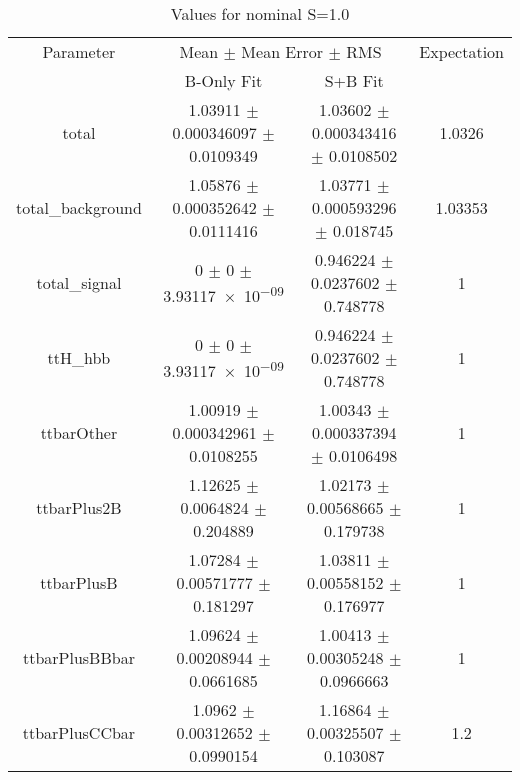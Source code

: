 \begin{table}
\centering
\caption{Values for nominal S=1.0}
\begin{tabular}{cccc}
\toprule
Parameter & \multicolumn{2}{c}{Mean $\pm$ Mean Error $\pm$ RMS} & Expectation\\
 & B-Only Fit & S+B Fit & \\
\midrule
total & \num{1.03911} $\pm$ \num{0.000346097} $\pm$ \num{0.0109349} & \num{1.03602} $\pm$ \num{0.000343416} $\pm$ \num{0.0108502} & \num{1.0326}\\
total\_background & \num{1.05876} $\pm$ \num{0.000352642} $\pm$ \num{0.0111416} & \num{1.03771} $\pm$ \num{0.000593296} $\pm$ \num{0.018745} & \num{1.03353}\\
total\_signal & \num{0} $\pm$ \num{0} $\pm$ \num{3.93117e-09} & \num{0.946224} $\pm$ \num{0.0237602} $\pm$ \num{0.748778} & \num{1}\\
ttH\_hbb & \num{0} $\pm$ \num{0} $\pm$ \num{3.93117e-09} & \num{0.946224} $\pm$ \num{0.0237602} $\pm$ \num{0.748778} & \num{1}\\
ttbarOther & \num{1.00919} $\pm$ \num{0.000342961} $\pm$ \num{0.0108255} & \num{1.00343} $\pm$ \num{0.000337394} $\pm$ \num{0.0106498} & \num{1}\\
ttbarPlus2B & \num{1.12625} $\pm$ \num{0.0064824} $\pm$ \num{0.204889} & \num{1.02173} $\pm$ \num{0.00568665} $\pm$ \num{0.179738} & \num{1}\\
ttbarPlusB & \num{1.07284} $\pm$ \num{0.00571777} $\pm$ \num{0.181297} & \num{1.03811} $\pm$ \num{0.00558152} $\pm$ \num{0.176977} & \num{1}\\
ttbarPlusBBbar & \num{1.09624} $\pm$ \num{0.00208944} $\pm$ \num{0.0661685} & \num{1.00413} $\pm$ \num{0.00305248} $\pm$ \num{0.0966663} & \num{1}\\
ttbarPlusCCbar & \num{1.0962} $\pm$ \num{0.00312652} $\pm$ \num{0.0990154} & \num{1.16864} $\pm$ \num{0.00325507} $\pm$ \num{0.103087} & \num{1.2}\\
\bottomrule
\end{tabular}
\end{table}
